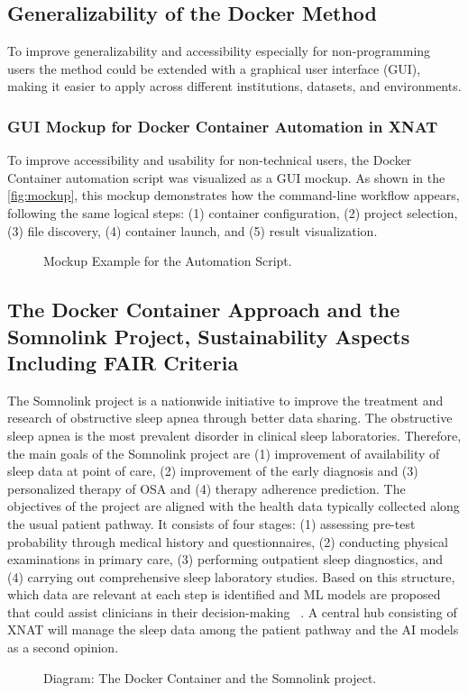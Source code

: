 \subsection{Generalizability of the Docker Method}
To improve generalizability and accessibility especially for non-programming users the method could be extended with a graphical user interface (GUI), making it easier to apply across different institutions, datasets, and environments. 
\normalsize
\subsubsection{GUI Mockup for Docker Container Automation in XNAT}
\normalsize
To improve accessibility and usability for non-technical users, the Docker Container  automation script was visualized as a GUI mockup. As shown in the \autoref{fig:mockup}, this mockup demonstrates how the command-line workflow appears, following the same logical steps: (1) container configuration, (2) project selection, (3) file discovery, (4) container launch, and (5) result visualization.
\normalsize
\begin{figure}[htbp]
    \centering
    \def\svgwidth{\linewidth} 
    
    \caption{ Mockup Example for the Automation Script.}
    \label{fig:mockup}
\end{figure}
\normalsize
\subsection{The Docker Container Approach and the Somnolink Project, Sustainability Aspects Including FAIR Criteria}

The Somnolink project is a nationwide initiative to improve the treatment and research of obstructive sleep apnea through better data sharing. The obstructive sleep apnea is the most prevalent disorder in clinical sleep laboratories. Therefore, the main goals of the Somnolink project are (1) improvement of availability of sleep data at point of care, (2) improvement of the early diagnosis and (3) personalized therapy of OSA and (4) therapy adherence prediction.
The objectives of the project are aligned with the health data typically collected along the usual patient pathway. It consists of four stages: (1) assessing pre-test probability through medical history and questionnaires, (2) conducting physical examinations in primary care, (3) performing outpatient sleep diagnostics, and (4) carrying out comprehensive sleep laboratory studies. Based on this structure, which data are relevant at each step is identified and ML models are proposed that could assist clinicians in their decision-making ~\cite{krefting_somnolink_2025}. A central hub consisting of XNAT will manage the sleep data among the patient pathway and the AI models as a second opinion.
\begin{figure}[H]
    \centering
    \def\svgwidth{\linewidth} 
    
    \caption{Diagram: The Docker Container and the Somnolink project.}
    \label{fig:somnolink}
\end{figure}

